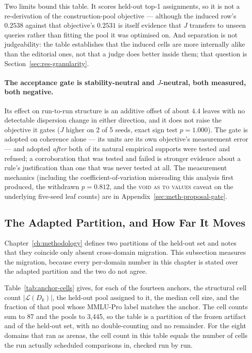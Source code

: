 Two limits bound this table. It scores held-out top-1 assignments, so
it is not a re-derivation of the construction-pool objective ---
although the induced row's $0.2538$ against that objective's $0.2531$
is itself evidence that $J$ transfers to unseen queries rather than
fitting the pool it was optimised on. And separation is not
judgeability: the table establishes that the induced cells are more
internally alike than the editorial ones, not that a judge does better
inside them; that question is Section~\ref{sec:res-granularity}.

\paragraph{The acceptance gate is stability-neutral and $J$-neutral,
both measured, both negative.} Its effect on run-to-run structure is
an additive offset of about $4.4$ leaves with no detectable dispersion
change in either direction, and it does not raise the objective it
gates ($J$ higher on 2 of 5 seeds, exact sign test $p = 1.000$). The
gate is adopted on coherence alone --- its units are its own
objective's measurement error --- and adopted \emph{after} both of its
natural empirical supports were tested and refused; a corroboration
that was tested and failed is stronger evidence about a rule's
justification than one that was never tested at all. The measurement
mechanics (including the coefficient-of-variation misreading this
analysis first produced, the withdrawn $p = 0.812$, and the
\textsc{void as to values} caveat on the underlying five-seed leaf
counts) are in Appendix~\ref{sec:meth-proposal-gate}.

\subsection{The Adapted Partition, and How Far It Moves}\label{sec:res-adapted-partition}

Chapter~\ref{ch:methodology} defines two partitions of the held-out
set and notes that they coincide only absent cross-domain migration.
This subsection measures the migration, because every per-domain
number in this chapter is stated over the adapted partition and the
two do not agree.

Table~\ref{tab:anchor-cells} gives, for each of the
fourteen anchors, the structural cell count $|\mathcal{L}(D_k)|$, the
held-out pool assigned to it, the median cell size, and the fraction of
that pool whose MMLU-Pro label matches the anchor. The cell counts sum
to 87 and the pools to 3{,}445, so the table is a partition of the
frozen artifact and of the held-out set, with no double-counting and no
remainder. For the eight domains that ran as arenas, the cell count in
this table equals the number of cells the run actually scheduled
comparisons in, checked run by run.

